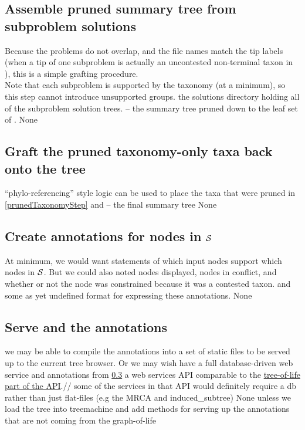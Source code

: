 \documentclass[11pt]{article}
\begin{document}
\subsection{Assemble pruned summary tree from subproblem solutions}\label{assemblyStep}
\stepExplanation Because the problems do not overlap, and the file names 
    match the tip labels (when a tip of one subproblem is actually an uncontested
    non-terminal taxon in \prunedTaxonomy), this is a simple grafting procedure.\\
    Note that each subproblem is supported by the taxonomy (at a minimum), so this
    step cannot introduce unsupported groups.
\stepInput the solutions directory holding all of the subproblem solution trees.
\stepOutput \prunedSummary -- the summary tree pruned down to the leaf set of \prunedTaxonomy.
\currImpl None
\implTODO {}
 
\subsection{Graft the pruned taxonomy-only taxa back onto the tree}
\stepExplanation ``phylo-referencing'' style logic can be used to place the
    taxa that were pruned in \ref{prunedTaxonomyStep}
\stepInput \prunedSummary and \taxonomy
\stepOutput \summaryTree -- the final summary tree
\currImpl None
\implTODO {}

\subsection{Create annotations for nodes in $\mathcal{S}$}\label{annotationsStep}
\stepExplanation At minimum, we would want statements of which
    input nodes support which nodes in $\mathcal{S}$.
    But we could also noted nodes displayed, nodes in conflict, 
    and whether or not the node was constrained because it was a contested taxon.
\stepInput \summaryTree and \expandedPhylo
\stepOutput some as yet undefined format for expressing these annotations.
\currImpl None
\implTODO {}

\subsection{Serve \summaryTree and the annotations}
\stepExplanation we may be able to compile the annotations into a set of
    static files to be served up to the current tree browser.
    Or we may wish have a full database-driven web service
    \stepInput \summaryTree and annotations from \ref{annotationsStep}
\stepOutput a web services API comparable to the
    \href{https://github.com/OpenTreeOfLife/opentree/wiki/Open-Tree-of-Life-APIs#tree-of-life}{tree-of-life part of the API}.//
    some of the services in that API would definitely require a db rather than just flat-files (e.g the MRCA and induced\_subtree)
\currImpl None unless we load the tree into treemachine and add methods for
    serving up the annotations that are not coming from the graph-of-life
\implTODO {}
\end{document}
